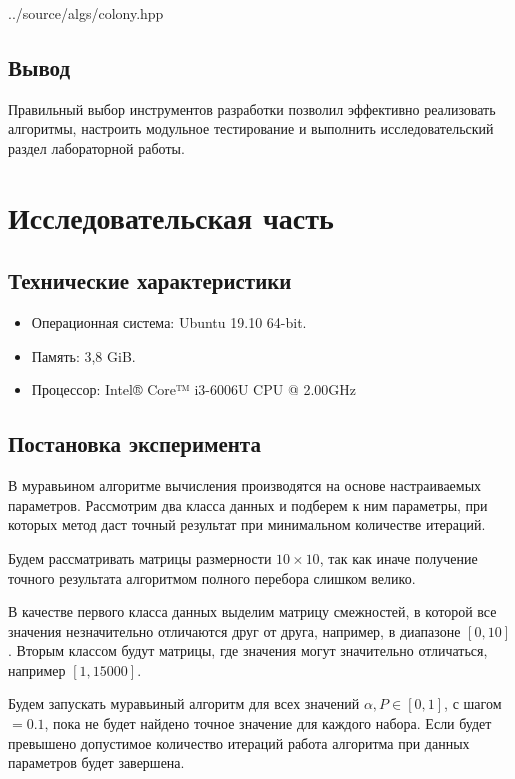\documentclass[a4paper,14pt]{extreport}
\begin{document}
\begin{lstinputlisting}[
	caption={Класс муравьиной колонии},
	label={lst:colony},
	style={cpp},
	linerange={7-41}
	]{../source/algs/colony.hpp}
\end{lstinputlisting}

\section*{Вывод}

Правильный выбор инструментов разработки позволил эффективно реализовать алгоритмы, настроить модульное тестирование и выполнить исследовательский раздел лабораторной работы.


\chapter{Исследовательская часть}

\section{Технические характеристики}

\begin{itemize}
	\item Операционная система: Ubuntu 19.10 64-bit.
	\item Память: 3,8 GiB.
	\item Процессор: Intel® Core™ i3-6006U CPU @ 2.00GHz
\end{itemize}

\section{Постановка эксперимента}

В муравьином алгоритме вычисления производятся на основе настраиваемых параметров.
Рассмотрим два класса данных и подберем к ним параметры, при которых метод даст точный результат при минимальном количестве итераций.

Будем рассматривать матрицы размерности $10\times10$, так как иначе получение точного результата алгоритмом полного перебора слишком велико.

В качестве первого класса данных выделим матрицу смежностей, в которой все значения незначительно отличаются друг от друга, например, в диапазоне $[0, 10]$.
Вторым классом будут матрицы, где значения могут значительно отличаться, например $[1, 15000]$.

Будем запускать муравьиный алгоритм для всех значений $\alpha, P\in[0, 1]$, с шагом $= 0.1$, пока не будет найдено точное значение для каждого набора.
Если будет превышено допустимое количество итераций работа алгоритма при данных параметров будет завершена.
\end{document}
